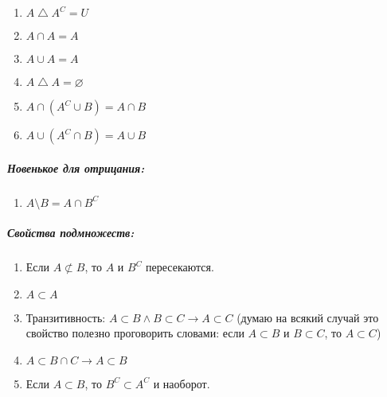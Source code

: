 \begin{thm}
\begin{enumerate}
\item $A \bigtriangleup A^C = U$
\item $A\cap A = A$
\item $A\cup A = A$
\item $A \bigtriangleup A = \varnothing$
\item $A \cap (A^C \cup B) = A \cap B$
\item $A \cup (A^C \cap B) = A \cup B$
\end{enumerate}
\subparagraph{Новенькое для отрицания:}
\begin{enumerate}
\item $A \setminus B = A \cap B^C$
\end{enumerate}
\subparagraph{Свойства подмножеств:}
\begin{enumerate}
\item Если $A \not \subset B$, то $A$ и $B^C$ пересекаются.
\item $A \subset A$
\item Транзитивность: $A \subset B \wedge B \subset C \rightarrow A \subset C$ (думаю на всякий случай это свойство полезно проговорить словами: если $A\subset B$ и $B\subset C$, то $A\subset C$)
\item $A \subset B\cap C \rightarrow A \subset B$
\item Если $A \subset B$, то $B^C \subset A^C$ и наоборот.
\end{enumerate}
\end{thm}
